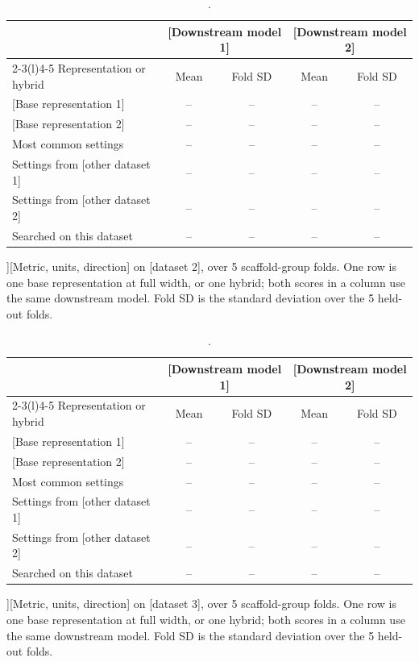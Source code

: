 \begin{table}[htbp]
\centering
\small
\begin{tabular}{@{}lcccc@{}}
\toprule
 & \multicolumn{2}{c}{[Downstream model 1]} & \multicolumn{2}{c}{[Downstream model 2]} \\
\cmidrule(lr){2-3}\cmidrule(l){4-5}
Representation or hybrid & Mean & Fold SD & Mean & Fold SD \\
\midrule
{[Base representation 1]} & -- & -- & -- & -- \\
{[Base representation 2]} & -- & -- & -- & -- \\
\addlinespace
Most common settings & -- & -- & -- & -- \\
Settings from [other dataset 1] & -- & -- & -- & -- \\
Settings from [other dataset 2] & -- & -- & -- & -- \\
\addlinespace
Searched on this dataset & -- & -- & -- & -- \\
\bottomrule
\end{tabular}
\caption[Search settings against base representations on [dataset 2].]{[Metric, units, direction] on [dataset 2], over 5 scaffold-group folds. One row is one base representation at full width, or one hybrid; both scores in a column use the same downstream model. Fold SD is the standard deviation over the 5 held-out folds.}
\label{tab:results_searchspace_2}
\end{table}

\begin{table}[htbp]
\centering
\small
\begin{tabular}{@{}lcccc@{}}
\toprule
 & \multicolumn{2}{c}{[Downstream model 1]} & \multicolumn{2}{c}{[Downstream model 2]} \\
\cmidrule(lr){2-3}\cmidrule(l){4-5}
Representation or hybrid & Mean & Fold SD & Mean & Fold SD \\
\midrule
{[Base representation 1]} & -- & -- & -- & -- \\
{[Base representation 2]} & -- & -- & -- & -- \\
\addlinespace
Most common settings & -- & -- & -- & -- \\
Settings from [other dataset 1] & -- & -- & -- & -- \\
Settings from [other dataset 2] & -- & -- & -- & -- \\
\addlinespace
Searched on this dataset & -- & -- & -- & -- \\
\bottomrule
\end{tabular}
\caption[Search settings against base representations on [dataset 3].]{[Metric, units, direction] on [dataset 3], over 5 scaffold-group folds. One row is one base representation at full width, or one hybrid; both scores in a column use the same downstream model. Fold SD is the standard deviation over the 5 held-out folds.}
\label{tab:results_searchspace_3}
\end{table}

